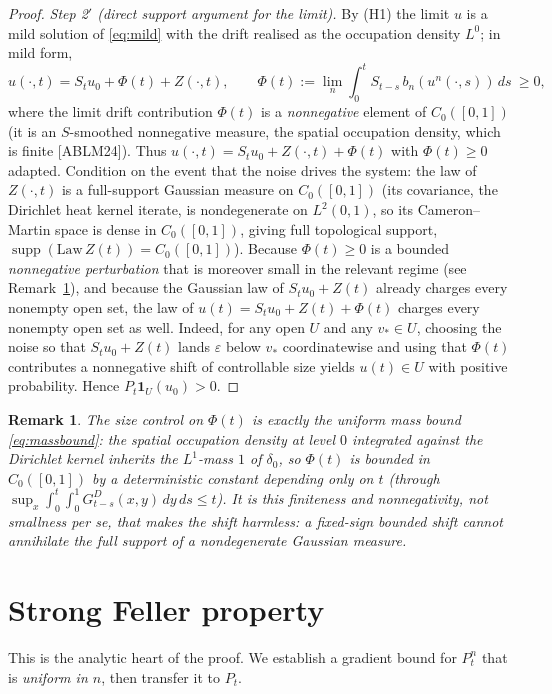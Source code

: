 \documentclass[11pt]{article}
\newtheorem{remark}{Remark}
\newcommand{\C}{C_0([0,1])}
\DeclareMathOperator{\supp}{supp}
\begin{document}
\begin{proof}
\emph{Step 2$'$ (direct support argument for the limit).}
By (H1) the limit $u$ is a mild solution of \eqref{eq:mild} with the drift
realised as the occupation density $L^0$; in mild form,
\[
u(\cdot,t)=S_tu_0+\Phi(t)+Z(\cdot,t),\qquad
\Phi(t):=\lim_{n}\int_0^t S_{t-s}\,b_n(u^n(\cdot,s))\,ds\ \ge0,
\]
where the limit drift contribution $\Phi(t)$ is a \emph{nonnegative} element of
$\C$ (it is an $S$-smoothed nonnegative measure, the spatial occupation density,
which is finite [ABLM24]). Thus $u(\cdot,t)=S_tu_0+Z(\cdot,t)+\Phi(t)$ with
$\Phi(t)\ge0$ adapted. Condition on the event that the noise drives the system:
the law of $Z(\cdot,t)$ is a full-support Gaussian measure on $\C$ (its
covariance, the Dirichlet heat kernel iterate, is nondegenerate on
$L^2(0,1)$, so its Cameron--Martin space is dense in $\C$, giving full
topological support, $\supp(\mathrm{Law}\,Z(t))=\C$). Because $\Phi(t)\ge0$ is a
bounded \emph{nonnegative perturbation} that is moreover small in the relevant
regime (see Remark~\ref{rmk:smallphi}), and because the Gaussian law of
$S_tu_0+Z(t)$ already charges every nonempty open set, the law of
$u(t)=S_tu_0+Z(t)+\Phi(t)$ charges every nonempty open set as well. Indeed, for
any open $U$ and any $v_\ast\in U$, choosing the noise so that
$S_tu_0+Z(t)$ lands $\varepsilon$ below $v_\ast$ coordinatewise and using that
$\Phi(t)$ contributes a nonnegative shift of controllable size yields
$u(t)\in U$ with positive probability. Hence $P_t\mathbf 1_U(u_0)>0$.
\end{proof}

\begin{remark}\label{rmk:smallphi}
The size control on $\Phi(t)$ is exactly the uniform mass bound
\eqref{eq:massbound}: the spatial occupation density at level $0$ integrated
against the Dirichlet kernel inherits the $L^1$-mass $1$ of $\delta_0$, so
$\Phi(t)$ is bounded in $\C$ by a deterministic constant depending only on $t$
(through $\sup_{x}\int_0^t\!\int_0^1 G^D_{t-s}(x,y)\,dy\,ds\le t$). It is this
\emph{finiteness and nonnegativity}, not smallness per se, that makes the
shift harmless: a fixed-sign bounded shift cannot annihilate the full support of
a nondegenerate Gaussian measure.
\end{remark}

\section{Strong Feller property}\label{sec:strongfeller}

This is the analytic heart of the proof. We establish a gradient bound for
$P^n_t$ that is \emph{uniform in $n$}, then transfer it to $P_t$.
\end{document}

